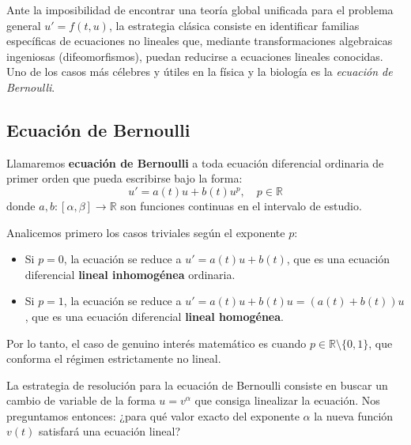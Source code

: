 Ante la imposibilidad de encontrar una teoría global unificada para el problema general $u' = f(t,u)$, la estrategia clásica consiste en identificar familias específicas de ecuaciones no lineales que, mediante transformaciones algebraicas ingeniosas (difeomorfismos), puedan reducirse a ecuaciones lineales conocidas. Uno de los casos más célebres y útiles en la física y la biología es la \textit{ecuación de Bernoulli}.

\subsection{Ecuación de Bernoulli}

\begin{definición}
    Llamaremos \textbf{ecuación de Bernoulli} a toda ecuación diferencial ordinaria de primer orden que pueda escribirse bajo la forma:
\[
    u' = a(t)u + b(t)u^p, \quad p \in \mathbb{R}
\]
donde $a, b : [\alpha, \beta] \to \mathbb{R}$ son funciones continuas en el intervalo de estudio. 
\end{definición}

Analicemos primero los casos triviales según el exponente $p$:
\begin{itemize}
    \item Si $p = 0$, la ecuación se reduce a $u' = a(t)u + b(t)$, que es una ecuación diferencial \textbf{lineal inhomogénea} ordinaria.
    \item Si $p = 1$, la ecuación se reduce a $u' = a(t)u + b(t)u = (a(t) + b(t))u$, que es una ecuación diferencial \textbf{lineal homogénea}.
\end{itemize}

Por lo tanto, el caso de genuino interés matemático es cuando $p \in \mathbb{R} \setminus \{0,1\}$, que conforma el régimen estrictamente no lineal. 

La estrategia de resolución para la ecuación de Bernoulli consiste en buscar un cambio de variable de la forma $u = v^\alpha$ que consiga linealizar la ecuación. Nos preguntamos entonces: ¿para qué valor exacto del exponente $\alpha$ la nueva función $v(t)$ satisfará una ecuación lineal? 

